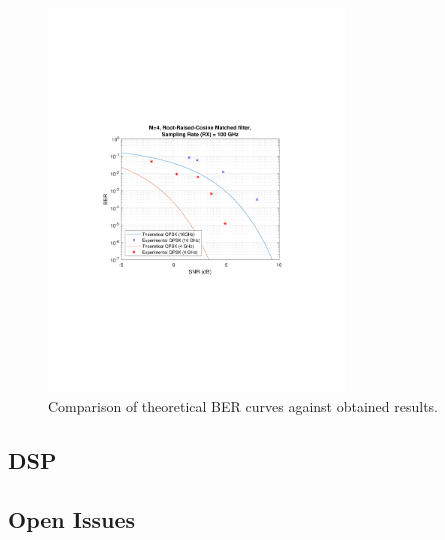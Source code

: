 \begin{refsection}
\begin{figure}[H]
	\centering
	\includegraphics[clip, trim=4cm 8cm 4cm 8cm, width=0.7\textwidth]{./sdf/m_qam_system/figures/experimentalVsTeor2.pdf}
	\caption{Comparison of theoretical BER curves against obtained results.}
	\label{fig:expBer}
\end{figure}
\subsection{DSP}

\subsection{Open Issues}

\newpage




\clearpage
\printbibliography[heading=subbibliography]
\end{refsection}
\cleardoublepage


